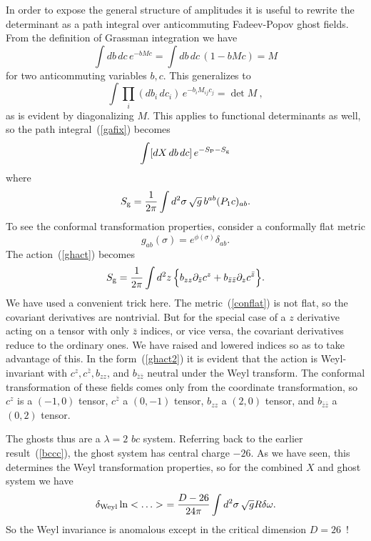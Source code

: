 In order to expose the general structure of amplitudes it 
is useful to rewrite the determinant as a path integral over
anticommuting Fadeev-Popov ghost fields.  From the definition of
Grassman integration we have
\begin{equation}
\int db\,dc\, e^{-bMc} = \int db\,dc\,(1 - bMc) = M
\end{equation}
for two anticommuting variables $b, c$.  This generalizes to
\begin{equation}
\int {\textstyle \prod_i} (db_i\,dc_i)\,
e^{-b_i M_{ij} c_j}   = \det M\ ,
\end{equation}
as is evident by diagonalizing $M$.  This applies to functional
determinants as well, so 
the path integral~(\ref{gafix}) becomes
\begin{equation}
\int [dX\, db\, dc]\, e^{-S_{\rm P} - S_{\rm g}}
\end{equation}
where
\begin{equation}
S_{\rm g} = \frac{1}{2\pi}  \int d^2\sigma\, \sqrt{g}\,
b^{ab} (P_1 c)_{ab}. \label{ghact}
\end{equation}
To see the conformal transformation properties, consider a
conformally flat metric
\begin{equation}
g_{ab}(\sigma) = e^{\phi (\sigma)} \delta_{ab}. \label{conflat}
\end{equation}
The action~(\ref{ghact}) becomes
\begin{equation}
S_{\rm g} = \frac{1}{2\pi}  \int d^2z\,
\Bigl\{ b_{zz} \partial_{\bar z} c^z
+ b_{\bar z \bar z} \partial_{z} c^{\bar z} \Bigr\}.
\label{ghact2}
\end{equation}
We have used a convenient trick here.  The
metric~(\ref{conflat}) is not flat, so the covariant
derivatives are nontrivial.  But for the special case of a $z$
derivative acting on a tensor with only $\bar z$ indices, or
vice versa, the covariant derivatives reduce to the ordinary
ones.  We have raised and lowered indices so as to take
advantage of this.  In the form~(\ref{ghact2}) it is evident
that the action is Weyl-invariant with $c^{z}, c^{\bar z},
b_{zz}$, and $b_{\bar z \bar z}$ neutral under the Weyl
transform.  The conformal transformation of these fields comes
only from the coordinate transformation, so $c^z$ is a $(-1,0)$
tensor,
$c^{\bar z}$ a $(0,-1)$ tensor, $b_{zz}$ a $(2,0)$ tensor, and
$b_{\bar z\bar z}$ a $(0,2)$ tensor.

The ghosts thus are a $\lambda = 2$ $bc$ system.  Referring
back to the earlier result~(\ref{bccc}), the ghost system has
central charge $-26$.  As we have seen, this determines the
Weyl transformation properties, so for the combined 
$X$ and ghost system we have
\begin{equation}
\delta_{\rm Weyl} \ln < \ldots >
\ = \frac{D-26}{24\pi} \int d^2\sigma\,\sqrt{g}R\delta\omega.
\end{equation}
So the Weyl invariance is anomalous except in the critical
dimension $D = 26$~\cite{Poly1}!

